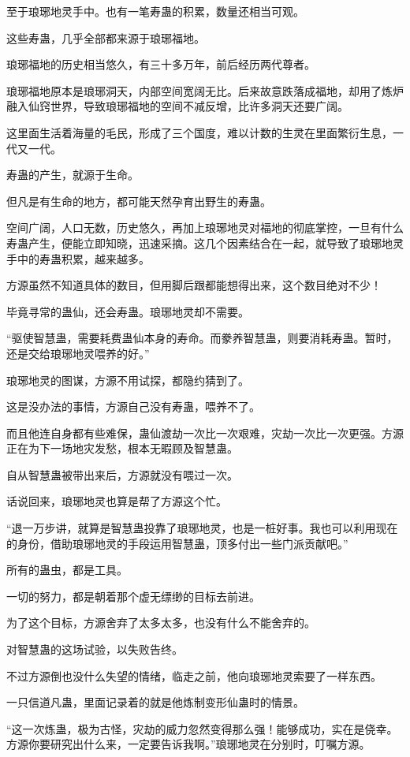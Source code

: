\begin{this_body}
至于琅琊地灵手中。也有一笔寿蛊的积累，数量还相当可观。

这些寿蛊，几乎全部都来源于琅琊福地。

琅琊福地的历史相当悠久，有三十多万年，前后经历两代尊者。

琅琊福地原本是琅琊洞天，内部空间宽阔无比。后来故意跌落成福地，却用了炼炉融入仙窍世界，导致琅琊福地的空间不减反增，比许多洞天还要广阔。

这里面生活着海量的毛民，形成了三个国度，难以计数的生灵在里面繁衍生息，一代又一代。

寿蛊的产生，就源于生命。

但凡是有生命的地方，都可能天然孕育出野生的寿蛊。

空间广阔，人口无数，历史悠久，再加上琅琊地灵对福地的彻底掌控，一旦有什么寿蛊产生，便能立即知晓，迅速采摘。这几个因素结合在一起，就导致了琅琊地灵手中的寿蛊积累，越来越多。

方源虽然不知道具体的数目，但用脚后跟都能想得出来，这个数目绝对不少！

毕竟寻常的蛊仙，还会寿蛊。琅琊地灵却不需要。

“驱使智慧蛊，需要耗费蛊仙本身的寿命。而豢养智慧蛊，则要消耗寿蛊。暂时，还是交给琅琊地灵喂养的好。”

琅琊地灵的图谋，方源不用试探，都隐约猜到了。

这是没办法的事情，方源自己没有寿蛊，喂养不了。

而且他连自身都有些难保，蛊仙渡劫一次比一次艰难，灾劫一次比一次更强。方源正在为下一场地灾发愁，根本无暇顾及智慧蛊。

自从智慧蛊被带出来后，方源就没有喂过一次。

话说回来，琅琊地灵也算是帮了方源这个忙。

“退一万步讲，就算是智慧蛊投靠了琅琊地灵，也是一桩好事。我也可以利用现在的身份，借助琅琊地灵的手段运用智慧蛊，顶多付出一些门派贡献吧。”

所有的蛊虫，都是工具。

一切的努力，都是朝着那个虚无缥缈的目标去前进。

为了这个目标，方源舍弃了太多太多，也没有什么不能舍弃的。

对智慧蛊的这场试验，以失败告终。

不过方源倒也没什么失望的情绪，临走之前，他向琅琊地灵索要了一样东西。

一只信道凡蛊，里面记录着的就是他炼制变形仙蛊时的情景。

“这一次炼蛊，极为古怪，灾劫的威力忽然变得那么强！能够成功，实在是侥幸。方源你要研究出什么来，一定要告诉我啊。”琅琊地灵在分别时，叮嘱方源。


\end{this_body}
